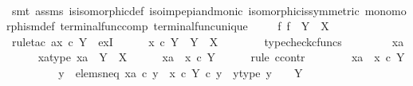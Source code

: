 \begin{isabellebody}
\ \ \ \ \isamarkupfalse%
\ {\isacharparenleft}{\kern0pt}smt\ assms\ is{\isacharunderscore}{\kern0pt}isomorphic{\isacharunderscore}{\kern0pt}def\ iso{\isacharunderscore}{\kern0pt}imp{\isacharunderscore}{\kern0pt}epi{\isacharunderscore}{\kern0pt}and{\isacharunderscore}{\kern0pt}monic\ isomorphic{\isacharunderscore}{\kern0pt}is{\isacharunderscore}{\kern0pt}symmetric\ monomorphism{\isacharunderscore}{\kern0pt}def{}\ terminal{\isacharunderscore}{\kern0pt}func{\isacharunderscore}{\kern0pt}comp\ terminal{\isacharunderscore}{\kern0pt}func{\isacharunderscore}{\kern0pt}unique{\isacharparenright}{\kern0pt}\isanewline
\ \ \isamarkupfalse%
\ \ {\isachardoublequoteopen}{\isasymexists}{\isacharbang}{\kern0pt}f{\isachardot}{\kern0pt}\ f\ {\isacharcolon}{\kern0pt}\ Y\ {\isasymrightarrow}\ X{\isachardoublequoteclose}\isanewline
\ \ \isamarkupfalse%
\ {\isacharparenleft}{\kern0pt}rule{\isacharunderscore}{\kern0pt}tac\ a{\isacharequal}{\kern0pt}{\isachardoublequoteopen}x\ {\isasymcirc}\isactrlsub c\ {\isasymbeta}\isactrlbsub Y\isactrlesub {\isachardoublequoteclose}\ \ ex{}I{\isacharparenright}{\kern0pt}\isanewline
\ \ \ \ \isamarkupfalse%
\ {\isachardoublequoteopen}x\ {\isasymcirc}\isactrlsub c\ {\isasymbeta}\isactrlbsub Y\isactrlesub \ {\isacharcolon}{\kern0pt}\ Y\ {\isasymrightarrow}\ X{\isachardoublequoteclose}\isanewline
\ \ \ \ \ \ \isamarkupfalse%
\ typecheck{\isacharunderscore}{\kern0pt}cfuncs\isanewline
\ \ \isamarkupfalse%
\isanewline
\ \ \ \ \isamarkupfalse%
\ xa\isanewline
\ \ \ \ \isamarkupfalse%
\ xa{\isacharunderscore}{\kern0pt}type{\isacharcolon}{\kern0pt}\ {\isachardoublequoteopen}xa\ {\isacharcolon}{\kern0pt}\ Y\ {\isasymrightarrow}\ X{\isachardoublequoteclose}\isanewline
\ \ \ \ \isamarkupfalse%
\ {\isachardoublequoteopen}xa\ {\isacharequal}{\kern0pt}\ x\ {\isasymcirc}\isactrlsub c\ {\isasymbeta}\isactrlbsub Y\isactrlesub {\isachardoublequoteclose}\isanewline
\ \ \ \ \isamarkupfalse%
\ {\isacharparenleft}{\kern0pt}rule\ ccontr{\isacharparenright}{\kern0pt}\isanewline
\ \ \ \ \ \ \isamarkupfalse%
\ {\isachardoublequoteopen}xa\ {\isasymnoteq}\ x\ {\isasymcirc}\isactrlsub c\ {\isasymbeta}\isactrlbsub Y\isactrlesub {\isachardoublequoteclose}\isanewline
\ \ \ \ \ \ \isamarkupfalse%
\ \isamarkupfalse%
\ y\ \ elems{\isacharunderscore}{\kern0pt}neq{\isacharcolon}{\kern0pt}\ {\isachardoublequoteopen}xa\ {\isasymcirc}\isactrlsub c\ y\ {\isasymnoteq}\ {\isacharparenleft}{\kern0pt}x\ {\isasymcirc}\isactrlsub c\ {\isasymbeta}\isactrlbsub Y\isactrlesub {\isacharparenright}{\kern0pt}\ {\isasymcirc}\isactrlsub c\ y{\isachardoublequoteclose}\ \ y{\isacharunderscore}{\kern0pt}type{\isacharcolon}{\kern0pt}\ {\isachardoublequoteopen}y\ {\isacharcolon}{\kern0pt}\ {\isasymone}\ {\isasymrightarrow}\ Y{\isachardoublequoteclose}\isanewline

\end{isabellebody}
